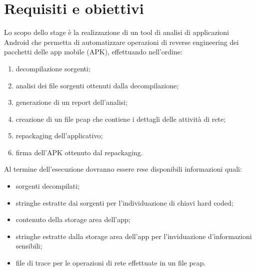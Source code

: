 
\section{Requisiti e obiettivi}\label{sec:requisiti-e-obiettivi}

Lo scopo dello stage è la realizzazione di un tool di analisi di applicazioni Android che permetta di automatizzare operazioni di reverse engineering dei pacchetti delle app mobile (APK), effettuando nell'ordine:
\begin{enumerate}
    \setlength\itemsep{0.1em}
    \item decompilazione sorgenti;
    \item analisi dei file sorgenti ottenuti dalla decompilazione;
    \item generazione di un report dell'analisi;
    \item creazione di un file \gls{pcap} che contiene i dettagli delle attività di rete;
    \item repackaging dell'applicativo;
    \item firma dell'APK ottenuto dal repackaging.
\end{enumerate}

Al termine dell'esecuzione dovranno essere rese disponibili informazioni quali:
\begin{itemize}
    \setlength\itemsep{0.1em}
    \item sorgenti decompilati;
    \item stringhe estratte dai sorgenti per l'individuazione di chiavi hard coded;
    \item contenuto della storage area dell'app;
    \item stringhe estratte dalla storage area dell'app per l'inviduazione d'informazioni sensibili;
    \item file di trace per le operazioni di rete effettuate in un file pcap.
\end{itemize}

